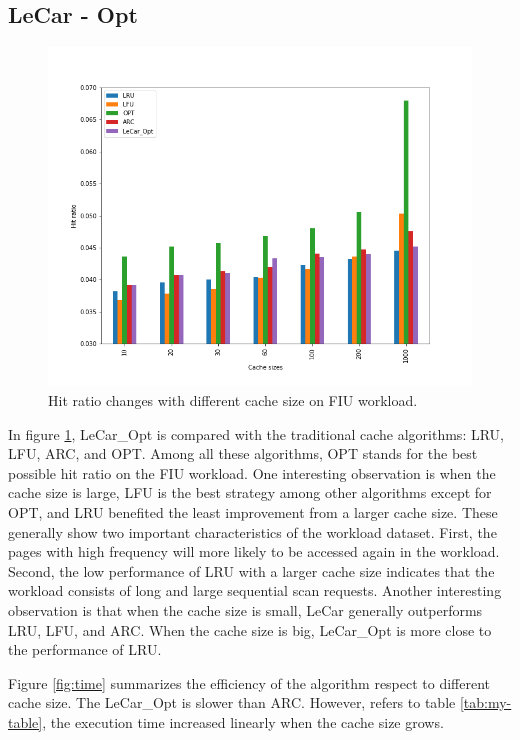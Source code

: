 \documentclass[letterpaper,twocolumn,10pt]{article}
\begin{document}
\subsection{LeCar - Opt}
\begin{figure}[!ht]
	\centering 
	\includegraphics[width=0.38\textheight]{hitratio_bar.png}
	\caption{Hit ratio changes with different cache size on FIU workload.
}
	\label{fig:lecar_res}
\end{figure}
In figure \ref{fig:lecar_res}, LeCar\_Opt is compared with the traditional cache algorithms: LRU, LFU, ARC, and OPT. Among all these algorithms, OPT stands for the best possible hit ratio on the FIU workload. One interesting observation is when the cache size is large, LFU is the best strategy among other algorithms except for OPT, and LRU benefited the least improvement from a larger cache size. These generally show two important characteristics of the workload dataset. First, the pages with high frequency will more likely to be accessed again in the workload. Second, the low performance of LRU with a larger cache size indicates that the workload consists of long and large sequential scan requests. Another interesting observation is that when the cache size is small, LeCar generally outperforms LRU, LFU, and ARC. When the cache size is big, LeCar\_Opt is more close to the performance of LRU. 

Figure \ref{fig:time} summarizes the efficiency of the algorithm respect to different cache size. The LeCar\_Opt is slower than ARC. However, refers to table \ref{tab:my-table}, the execution time increased linearly when the cache size grows.
\end{document}

